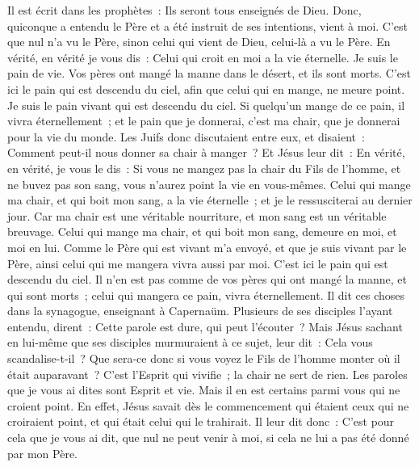 \begin{multicols}{2}
Il est écrit dans les prophètes~: Ils seront tous enseignés de Dieu. Donc, quiconque a entendu le Père et a été instruit de ses intentions, vient à moi.
C'est que nul n'a vu le Père, sinon celui qui vient de Dieu, celui-là a vu le Père.
En vérité, en vérité je vous dis~: Celui qui croit en moi a la vie éternelle.
Je suis le pain de vie.
Vos pères ont mangé la manne dans le désert, et ils sont morts.
C'est ici le pain qui est descendu du ciel, afin que celui qui en mange, ne meure point.
Je suis le pain vivant qui est descendu du ciel. Si quelqu'un mange de ce pain, il vivra éternellement~; et le pain que je donnerai, c'est ma chair, que je donnerai pour la vie du monde.
Les Juifs donc discutaient entre eux, et disaient~: Comment peut-il nous donner sa chair à manger~?
Et Jésus leur dit~: En vérité, en vérité, je vous le dis~: Si vous ne mangez pas la chair du Fils de l'homme, et ne buvez pas son sang, vous n'aurez point la vie en vous-mêmes.
Celui qui mange ma chair, et qui boit mon sang, a la vie éternelle~; et je le ressusciterai au dernier jour.
Car ma chair est une véritable nourriture, et mon sang est un véritable breuvage.
Celui qui mange ma chair, et qui boit mon sang, demeure en moi, et moi en lui.
Comme le Père qui est vivant m'a envoyé, et que je suis vivant par le Père, ainsi celui qui me mangera vivra aussi par moi.
C'est ici le pain qui est descendu du ciel. Il n'en est pas comme de vos pères qui ont mangé la manne, et qui sont morts~; celui qui mangera ce pain, vivra éternellement.
Il dit ces choses dans la synagogue, enseignant à Capernaüm.
Plusieurs de ses disciples l'ayant entendu, dirent~: Cette parole est dure, qui peut l'écouter~?
Mais Jésus sachant en lui-même que ses disciples murmuraient à ce sujet, leur dit~: Cela vous scandalise-t-il~?
Que sera-ce donc si vous voyez le Fils de l'homme monter où il était auparavant~?
C'est l'Esprit qui vivifie~; la chair ne sert de rien. Les paroles que je vous ai dites sont Esprit et vie.
Mais il en est certains parmi vous qui ne croient point. En effet, Jésus savait dès le commencement qui étaient ceux qui ne croiraient point, et qui était celui qui le trahirait.
Il leur dit donc~: C'est pour cela que je vous ai dit, que nul ne peut venir à moi, si cela ne lui a pas été donné par mon Père.

\end{multicols}
